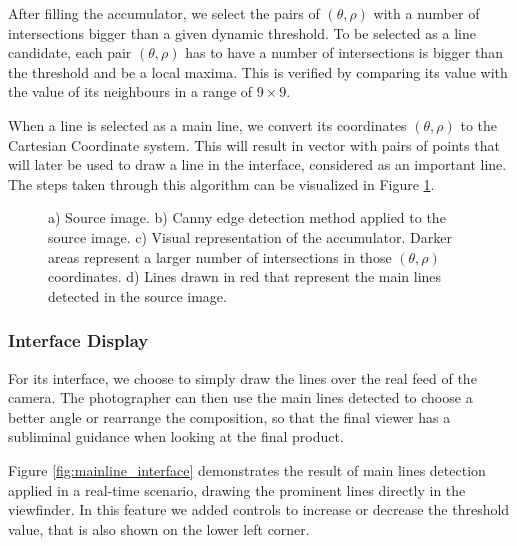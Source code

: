 After filling the accumulator, we select the pairs of $(\theta,\rho)$ with a number of intersections bigger than a given dynamic threshold. To be selected as a line candidate, each pair $(\theta,\rho)$ has to have a number of intersections is bigger than the threshold and be a local maxima. This is verified by comparing its value with the value of its neighbours in a range of $9 \times 9$.

When a line is selected as a main line, we convert its coordinates $(\theta,\rho)$ to the Cartesian Coordinate system. This will result in vector with pairs of points that will later be used to draw a line in the interface, considered as an important line. The steps taken through this algorithm can be visualized in Figure \ref{fig:hough_pipeline}.

\begin{figure}[htb]
	\centering
	\begin{minipage}[b][9cm]{0.5\textwidth}
  		\centering
  		\vfill
  		\vfill
  		\renewcommand{\thesubfigure}{(d)}
  	\end{minipage}
  	\renewcommand{\thesubfigure}{(c)}
	\caption{a) Source image. b) Canny edge detection method applied to the source image. c) Visual representation of the accumulator. Darker areas represent a larger number of intersections in those $(\theta,\rho)$ coordinates. d) Lines drawn in red that represent the main lines detected in the source image.}
    \label{fig:hough_pipeline}
\end{figure}

\subsubsection{Interface Display}

For its interface, we choose to simply draw the lines over the real feed of the camera. The photographer can then use the main lines detected to choose a better angle or rearrange the composition, so that the final viewer has a subliminal guidance when looking at the final product.

Figure \ref{fig:mainline_interface} demonstrates the result of main lines detection applied in a real-time scenario, drawing the prominent lines directly in the viewfinder. In this feature we added controls to increase or decrease the threshold value, that is also shown on the lower left corner.

